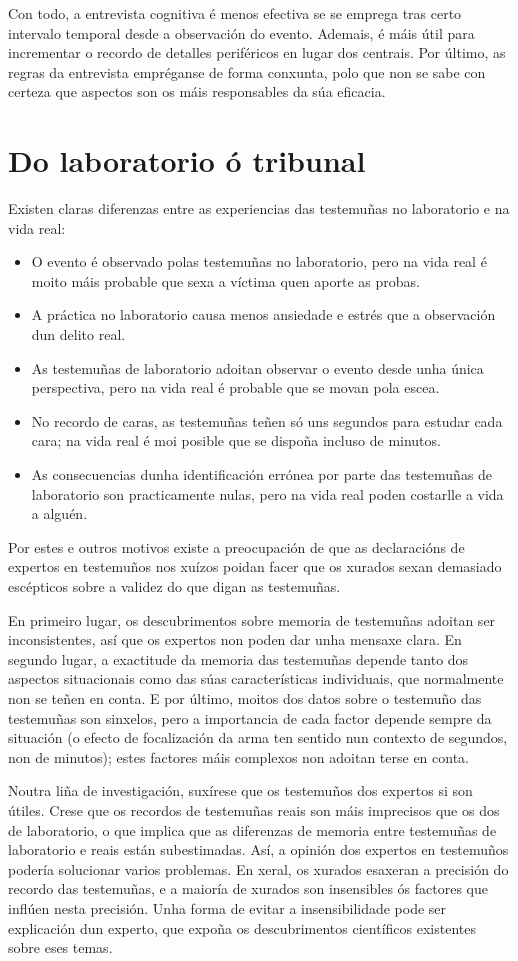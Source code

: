 \documentclass[a4paper,11pt]{article}
\begin{document}
\begin{itemize}
	Con todo, a entrevista cognitiva é menos efectiva se se emprega tras certo intervalo temporal
	desde a observación do evento. Ademais, é máis útil para incrementar o recordo de detalles
	periféricos en lugar dos centrais. Por último, as regras da entrevista empréganse de forma
	conxunta, polo que non se sabe con certeza que aspectos son os máis responsables da súa 
	eficacia.
\end{itemize}

\section{Do laboratorio ó tribunal}
Existen claras diferenzas entre as experiencias das testemuñas no laboratorio e na vida real: 
\begin{itemize}
	\item O evento é observado polas testemuñas no laboratorio, pero na vida real é moito máis
	probable que sexa a víctima quen aporte as probas.
	\item A práctica no laboratorio causa menos ansiedade e estrés que a observación dun delito 
	real.
	\item As testemuñas de laboratorio adoitan observar o evento desde unha única perspectiva, pero 
	na vida real é probable que se movan pola escea. 
	\item No recordo de caras, as testemuñas teñen só uns segundos para estudar cada cara; na vida
	real é moi posible que se dispoña incluso de minutos. 
	\item As consecuencias dunha identificación errónea por parte das testemuñas de laboratorio son
	practicamente nulas, pero na vida real poden costarlle a vida a alguén.
\end{itemize}

Por estes e outros motivos existe a preocupación de que as declaracións de expertos en testemuños nos xuízos poidan facer que os xurados sexan demasiado escépticos sobre a validez do que digan as testemuñas.

En primeiro lugar, os descubrimentos sobre memoria de testemuñas adoitan ser inconsistentes, así que os expertos non poden dar unha mensaxe clara. En segundo lugar, a exactitude da memoria das testemuñas depende tanto dos aspectos situacionais como das súas características individuais, que normalmente non se teñen en conta. E por último, moitos dos datos sobre o testemuño das testemuñas son sinxelos, pero a importancia de cada factor depende sempre da situación (o efecto de focalización da arma ten sentido nun contexto de segundos, non de minutos); estes factores máis complexos non adoitan terse en conta.

Noutra liña de investigación, suxírese que os testemuños dos expertos si son útiles. Crese que os recordos de testemuñas reais son máis imprecisos que os dos de laboratorio, o que implica que as diferenzas de memoria entre testemuñas de laboratorio e reais están subestimadas. Así, a opinión dos expertos en testemuños podería solucionar varios problemas. En xeral, os xurados esaxeran a precisión do recordo das testemuñas, e a maioría de xurados son insensibles ós factores que inflúen nesta precisión. Unha forma de evitar a insensibilidade pode ser explicación dun experto, que expoña os descubrimentos científicos existentes sobre eses temas.
\end{document}
